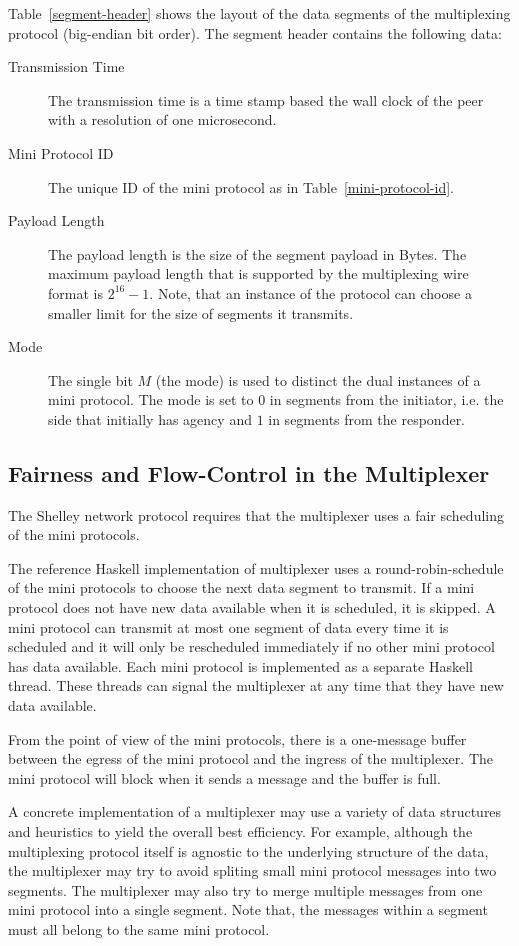 \documentclass{report}
\theoremstyle{definition}{
  \newtheorem{lemma}{Lemma}[section] %
  \newtheorem{definition}[lemma]{Definition}
}
\theoremstyle{theorem}{
  \newtheorem{invariant}[lemma]{Invariant}
  \newtheorem{proofobligation}[lemma]{Proof Obligation}
}
\numberwithin{equation}{lemma}
\begin{document}
Table~\ref{segment-header} shows the layout of the data segments of the multiplexing protocol
(big-endian bit order).
The segment header contains the following data:
\begin{description}
\item[Transmission Time]
  The transmission time is a time stamp based the wall clock of the peer with a
  resolution of one microsecond.
\item[Mini Protocol ID] The unique ID of the mini protocol as in Table~\ref{mini-protocol-id}.
\item[Payload Length] The payload length is the size of the segment payload in Bytes.
  The maximum payload length that is supported by the multiplexing wire format is $2^{16}-1$.
  Note, that an instance of the protocol can choose a smaller limit for the size of segments it transmits.
\item[Mode] The single bit $M$ (the mode) is used to distinct the dual instances of a mini protocol.
  The mode is set to $0$ in segments from the initiator, i.e. the side that initially has agency and
  $1$ in segments from the responder.
\end{description}

\subsection{Fairness and Flow-Control in the Multiplexer}
The Shelley network protocol requires that the multiplexer uses a fair scheduling of the mini protocols.

The reference Haskell implementation of multiplexer uses a round-robin-schedule of the mini protocols
to choose the next data segment to transmit.
If a mini protocol does not have new data available when it is scheduled, it is skipped.
A mini protocol can transmit at most one segment of data every time it is scheduled
and it will only be rescheduled immediately if no other mini protocol has data available.
Each mini protocol is implemented as a separate Haskell thread.
These threads can signal the multiplexer at any time that they have new data available.

From the point of view of the mini protocols, there is a one-message buffer between the egress of
the mini protocol and the ingress of the multiplexer.
The mini protocol will block when it sends a message and the buffer is full.

A concrete implementation of a multiplexer may use a variety of data structures and heuristics to
yield the overall best efficiency.
For example, although the multiplexing protocol itself is agnostic to the underlying structure of
the data, the multiplexer may try to avoid spliting small mini protocol messages into two segments.
The multiplexer may also try to merge multiple messages from one mini protocol into a
single segment.
Note that, the messages within a segment must all belong to the same mini protocol.
\end{document}
